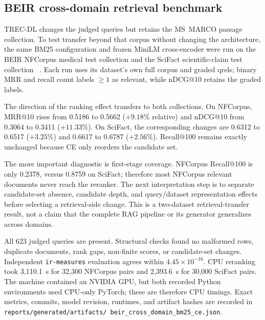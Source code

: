 \documentclass[11pt,a4paper]{article}
\makeatletter
\newcommand{\mrr}{MRR@10}
\newcommand{\ndcg}{nDCG@10}
\newcommand{\recallH}{Recall@100}
\newcommand{\recallK}{Recall@1000}
\newcommand{\bmtwofive}{BM25}
\makeatother
\begin{document}
\subsection{BEIR cross-domain retrieval benchmark}
\label{sec:beir-results}

TREC-DL changes the judged queries but retains the MS~MARCO passage
collection.  To test transfer beyond that corpus without changing the
architecture, the same \bmtwofive{} configuration and frozen MiniLM
cross-encoder were run on the BEIR NFCorpus medical test collection
and the SciFact scientific-claim test collection
~\cite{thakur2021beir,boteva2016nfcorpus,wadden2020scifact}.  Each run uses its
dataset's own full corpus and graded qrels; binary MRR and recall count
labels $\geq 1$ as relevant, while \ndcg{} retains the graded labels.

\begin{table}[H]
  \centering\small
  \caption{Full-corpus \bmtwofive{} and fixed top-100 cross-encoder
  reranking on all 323 NFCorpus and 300 SciFact test queries.  The
  reranked files have depth 100, so \recallK{} is not applicable.}
  \label{tab:beir-cross-domain}
  
\end{table}

The direction of the ranking effect transfers to both collections.
On NFCorpus, \mrr{} rises from 0.5186 to 0.5662 ($+9.18\%$ relative)
and \ndcg{} from 0.3064 to 0.3411 ($+11.33\%$).  On SciFact, the
corresponding changes are 0.6312 to 0.6517 ($+3.25\%$) and 0.6617 to
0.6787 ($+2.56\%$).  Recall@100 remains exactly unchanged because CE
only reorders the candidate set.

The more important diagnostic is first-stage coverage.  NFCorpus
\recallH{} is only 0.2378, versus 0.8759 on SciFact; therefore most
NFCorpus relevant documents never reach the reranker.  The next
interpretation step is to separate candidate-set absence, candidate
depth, and query/dataset representation effects before selecting a
retrieval-side change.  This is a two-dataset retrieval-transfer
result, not a claim that the complete RAG pipeline or its generator
generalizes across domains.

All 623 judged queries are present.  Structural checks found no
malformed rows, duplicate documents, rank gaps, non-finite scores, or
candidate-set changes.  Independent \texttt{ir-measures} evaluation
agrees within $4.45\!\times\!10^{-16}$.  CPU reranking took 3,110.1~s
for 32,300 NFCorpus pairs and 2,393.6~s for 30,000 SciFact pairs.  The
machine contained an NVIDIA GPU, but both recorded Python environments
used CPU-only PyTorch; these are therefore CPU timings.  Exact metrics,
commits, model revision, runtimes, and artifact hashes are recorded in
\texttt{reports/generated/artifacts/
beir\_cross\_domain\_bm25\_ce.json}.
\end{document}
